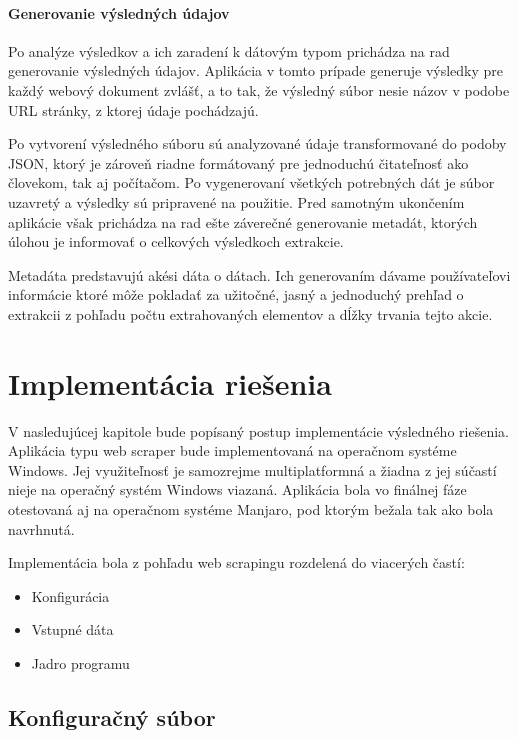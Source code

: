 \subsubsection{Generovanie výsledných údajov}

Po analýze výsledkov a ich zaradení k dátovým typom prichádza na rad generovanie výsledných údajov. Aplikácia v tomto prípade generuje výsledky pre každý webový dokument zvlášť, a to tak, že výsledný súbor nesie názov v podobe URL stránky, z ktorej údaje pochádzajú.

Po vytvorení výsledného súboru sú analyzované údaje transformované do podoby JSON, ktorý je zároveň riadne formátovaný pre jednoduchú čitateľnosť ako človekom, tak aj počítačom. Po vygenerovaní všetkých potrebných dát je súbor uzavretý a výsledky sú pripravené na použitie. Pred samotným ukončením aplikácie však prichádza na rad ešte záverečné generovanie metadát, ktorých úlohou je informovať o celkových výsledkoch extrakcie.

Metadáta predstavujú akési dáta o dátach. Ich generovaním dávame používateľovi informácie ktoré môže pokladať za užitočné, jasný a jednoduchý prehľad o extrakcii z pohľadu počtu extrahovaných elementov a dĺžky trvania tejto akcie.

\chapter{Implementácia riešenia}

V nasledujúcej kapitole bude popísaný postup implementácie výsledného riešenia. Aplikácia typu web scraper bude implementovaná na operačnom systéme Windows. Jej využiteľnosť je samozrejme multiplatformná a žiadna z jej súčastí nieje na operačný systém Windows viazaná. Aplikácia bola vo finálnej fáze otestovaná aj na operačnom systéme Manjaro, pod ktorým bežala tak ako bola navrhnutá.

Implementácia bola z pohľadu web scrapingu rozdelená do viacerých častí:

\begin{itemize}
    \item {Konfigurácia}
    \item {Vstupné dáta}
    \item {Jadro programu}
\end{itemize}

\bigskip

\section{Konfiguračný súbor}

